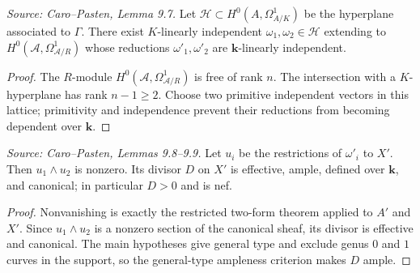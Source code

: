 \begin{lemma}
  \label{lem:cp_choice_differentials}
  \textit{Source: Caro--Pasten, Lemma 9.7.}
  Let \(\mathcal H\subset H^0(A,\Omega^1_{A/K})\) be the hyperplane associated
  to \(\Gamma\).  There exist \(K\)-linearly independent
  \(\omega_1,\omega_2\in\mathcal H\) extending to
  \(H^0(\mathcal A,\Omega^1_{\mathcal A/R})\) whose reductions
  \(\omega'_1,\omega'_2\) are \(\mathbf k\)-linearly independent.
\end{lemma}
\begin{proof}
  The \(R\)-module \(H^0(\mathcal A,\Omega^1_{\mathcal A/R})\) is free of rank
  \(n\).  The intersection with a \(K\)-hyperplane has rank \(n-1\ge2\).
  Choose two primitive independent vectors in this lattice; primitivity and
  independence prevent their reductions from becoming dependent over
  \(\mathbf k\).
\end{proof}

\begin{lemma}
  \label{lem:cp_special_canonical_divisor}
  \textit{Source: Caro--Pasten, Lemmas 9.8--9.9.}
  Let \(u_i\) be the restrictions of \(\omega'_i\) to \(X'\).  Then
  \(u_1\wedge u_2\) is nonzero.  Its divisor \(D\) on \(X'\) is effective,
  ample, defined over \(\mathbf k\), and canonical; in particular \(D>0\) and
  is nef.
\end{lemma}
\begin{proof}
  Nonvanishing is exactly the restricted two-form theorem applied to
  \(A'\) and \(X'\).  Since \(u_1\wedge u_2\) is a nonzero section of the
  canonical sheaf, its divisor is effective and canonical.  The main
  hypotheses give general type and exclude genus \(0\) and \(1\) curves in
  the support, so the general-type ampleness criterion makes \(D\) ample.
\end{proof}

